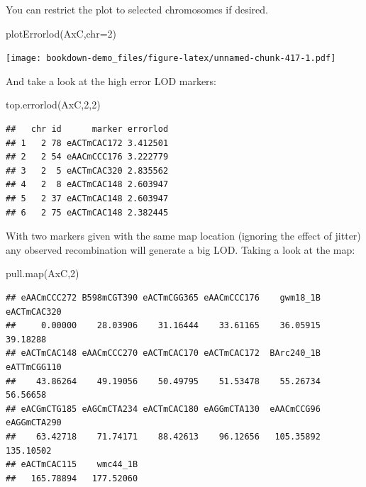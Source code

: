 \documentclass[
]{book}
\newenvironment{Shaded}{\begin{snugshade}}{\end{snugshade}}
\newcommand{\AttributeTok}[1]{\textcolor[rgb]{0.77,0.63,0.00}{#1}}
\newcommand{\DecValTok}[1]{\textcolor[rgb]{0.00,0.00,0.81}{#1}}
\newcommand{\FunctionTok}[1]{\textcolor[rgb]{0.00,0.00,0.00}{#1}}
\newcommand{\NormalTok}[1]{#1}
\begin{document}
You can restrict the plot to selected chromosomes if desired.

\begin{Shaded}
\begin{Highlighting}[]
\FunctionTok{plotErrorlod}\NormalTok{(AxC,}\AttributeTok{chr=}\DecValTok{2}\NormalTok{) }
\end{Highlighting}
\end{Shaded}

\texttt{[image: bookdown-demo\_files/figure-latex/unnamed-chunk-417-1.pdf]}

And take a look at the high error LOD markers:

\begin{Shaded}
\begin{Highlighting}[]
\FunctionTok{top.errorlod}\NormalTok{(AxC,}\DecValTok{2}\NormalTok{,}\DecValTok{2}\NormalTok{)}
\end{Highlighting}
\end{Shaded}

\begin{verbatim}
##   chr id      marker errorlod
## 1   2 78 eACTmCAC172 3.412501
## 2   2 54 eAACmCCC176 3.222779
## 3   2  5 eACTmCAC320 2.835562
## 4   2  8 eACTmCAC148 2.603947
## 5   2 37 eACTmCAC148 2.603947
## 6   2 75 eACTmCAC148 2.382445
\end{verbatim}

With two markers given with the same map location (ignoring the effect of jitter) any observed recombination will generate a big LOD. Taking a look at the map:

\begin{Shaded}
\begin{Highlighting}[]
\FunctionTok{pull.map}\NormalTok{(AxC,}\DecValTok{2}\NormalTok{) }
\end{Highlighting}
\end{Shaded}

\begin{verbatim}
## eAACmCCC272 B598mCGT390 eACTmCGG365 eAACmCCC176    gwm18_1B eACTmCAC320 
##     0.00000    28.03906    31.16444    33.61165    36.05915    39.18288 
## eACTmCAC148 eAACmCCC270 eACTmCAC170 eACTmCAC172  BArc240_1B eATTmCGG110 
##    43.86264    49.19056    50.49795    51.53478    55.26734    56.56658 
## eACGmCTG185 eAGCmCTA234 eACTmCAC180 eAGGmCTA130  eAACmCCG96 eAGGmCTA290 
##    63.42718    71.74171    88.42613    96.12656   105.35892   135.10502 
## eACTmCAC115    wmc44_1B 
##   165.78894   177.52060
\end{verbatim}
\end{document}
